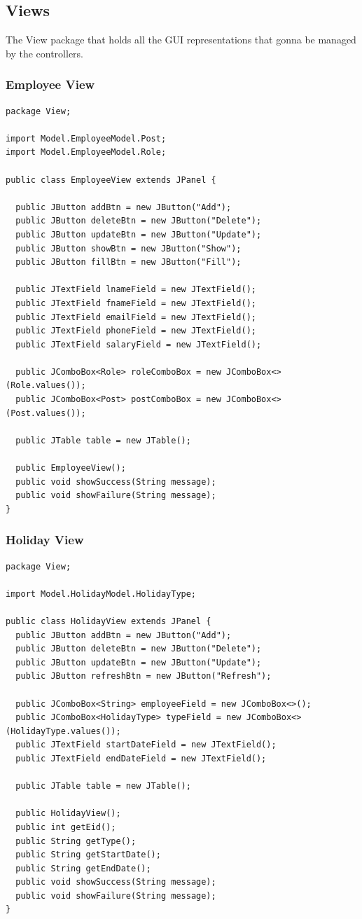 \documentclass[12pt]{article}
\begin{document}
\pagebreak

\subsection{Views}

The View package that holds all the GUI representations that gonna be
managed by the controllers.

\subsubsection{Employee View}
\begin{lstlisting}
package View;

import Model.EmployeeModel.Post;
import Model.EmployeeModel.Role;

public class EmployeeView extends JPanel {

  public JButton addBtn = new JButton("Add");
  public JButton deleteBtn = new JButton("Delete");
  public JButton updateBtn = new JButton("Update");
  public JButton showBtn = new JButton("Show");
  public JButton fillBtn = new JButton("Fill");

  public JTextField lnameField = new JTextField();
  public JTextField fnameField = new JTextField();
  public JTextField emailField = new JTextField();
  public JTextField phoneField = new JTextField();
  public JTextField salaryField = new JTextField();

  public JComboBox<Role> roleComboBox = new JComboBox<>(Role.values());
  public JComboBox<Post> postComboBox = new JComboBox<>(Post.values());

  public JTable table = new JTable();

  public EmployeeView();
  public void showSuccess(String message);
  public void showFailure(String message);
}
\end{lstlisting}

\pagebreak

\subsubsection{Holiday View}
\begin{lstlisting}
package View;

import Model.HolidayModel.HolidayType;

public class HolidayView extends JPanel {
  public JButton addBtn = new JButton("Add");
  public JButton deleteBtn = new JButton("Delete");
  public JButton updateBtn = new JButton("Update");
  public JButton refreshBtn = new JButton("Refresh");

  public JComboBox<String> employeeField = new JComboBox<>();
  public JComboBox<HolidayType> typeField = new JComboBox<>(HolidayType.values());
  public JTextField startDateField = new JTextField();
  public JTextField endDateField = new JTextField();

  public JTable table = new JTable();

  public HolidayView();
  public int getEid();
  public String getType();
  public String getStartDate();
  public String getEndDate();
  public void showSuccess(String message);
  public void showFailure(String message);
}
\end{lstlisting}
\end{document}
